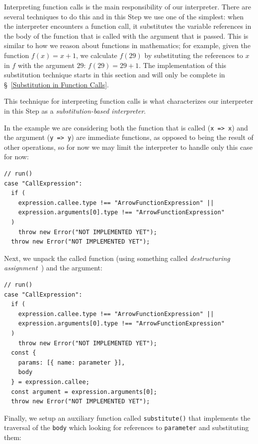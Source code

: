 \documentclass[12pt, oneside]{book}
\begin{document}
Interpreting function calls is the main responsibility of our interpreter. There are several techniques to do this and in this Step we use one of the simplest: when the interpreter encounters a function call, it substitutes the variable references in the body of the function that is called with the argument that is passed. This is similar to how we reason about functions in mathematics; for example, given the function $f(x) = x + 1$, we calculate $f(29)$ by substituting the references to $x$ in $f$ with the argument $29$: $f(29) = 29 + 1$. The implementation of this substitution technique starts in this section and will only be complete in §~\ref{Substitution in Function Calls}.

\begin{mdframed}[frametitle = {Technical Terms}]
This technique for interpreting function calls is what characterizes our interpreter in this Step as a \emph{substitution-based interpreter}.
\end{mdframed}

In the example we are considering both the function that is called (\texttt{x => x}) and the argument (\texttt{y => y}) are immediate functions, as opposed to being the result of other operations, so for now we may limit the interpreter to handle only this case for now:

\begin{verbatim}
// run()
case "CallExpression":
  if (
    expression.callee.type !== "ArrowFunctionExpression" ||
    expression.arguments[0].type !== "ArrowFunctionExpression"
  )
    throw new Error("NOT IMPLEMENTED YET");
  throw new Error("NOT IMPLEMENTED YET");
\end{verbatim}

Next, we unpack the called function (using something called \emph{destructuring assignment}~\cite{destructuring-assignment}) and the argument:

\begin{verbatim}
// run()
case "CallExpression":
  if (
    expression.callee.type !== "ArrowFunctionExpression" ||
    expression.arguments[0].type !== "ArrowFunctionExpression"
  )
    throw new Error("NOT IMPLEMENTED YET");
  const {
    params: [{ name: parameter }],
    body
  } = expression.callee;
  const argument = expression.arguments[0];
  throw new Error("NOT IMPLEMENTED YET");
\end{verbatim}

Finally, we setup an auxiliary function called \texttt{substitute()} that implements the traversal of the \texttt{body} which looking for references to \texttt{parameter} and substituting them:
\end{document}
